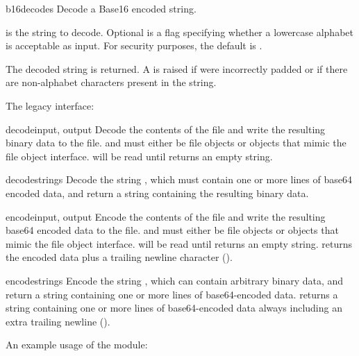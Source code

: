 \begin{funcdesc}{b16decode}{s}
Decode a Base16 encoded string.

 is the string to decode.  Optional  is a flag
specifying whether a lowercase alphabet is acceptable as input.  For
security purposes, the default is .

The decoded string is returned.  A  is raised if
 were incorrectly padded or if there are non-alphabet
characters present in the string.
\end{funcdesc}

The legacy interface:

\begin{funcdesc}{decode}{input, output}
Decode the contents of the  file and write the resulting
binary data to the  file.
 and  must either be file objects or objects that
mimic the file object interface.  will be read until
 returns an empty string.
\end{funcdesc}

\begin{funcdesc}{decodestring}{s}
Decode the string , which must contain one or more lines of
base64 encoded data, and return a string containing the resulting
binary data.
\end{funcdesc}

\begin{funcdesc}{encode}{input, output}
Encode the contents of the  file and write the resulting
base64 encoded data to the  file.
 and  must either be file objects or objects that
mimic the file object interface.  will be read until
 returns an empty string.  
returns the encoded data plus a trailing newline character
().
\end{funcdesc}

\begin{funcdesc}{encodestring}{s}
Encode the string , which can contain arbitrary binary data,
and return a string containing one or more lines of
base64-encoded data.   returns a
string containing one or more lines of base64-encoded data
always including an extra trailing newline ().
\end{funcdesc}

An example usage of the module:

